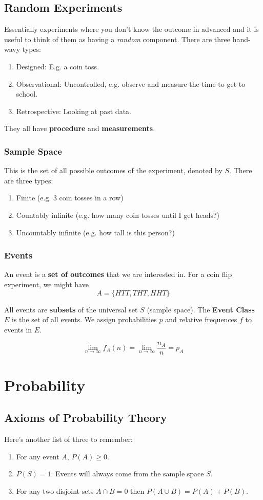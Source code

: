 \documentclass[a4paper,12pt]{report}
\begin{document}
\section{Random Experiments}
Essentially experiments where you don't know the outcome in advanced and it is useful to think of them as 
having a \textit{random} component. There are three hand-wavy types:
\begin{enumerate}
\item Designed: E.g. a coin toss.
\item Observational: Uncontrolled, e.g. observe and measure the time to get to school.
\item Retrospective: Looking at past data.
\end{enumerate}

They all have \textbf{procedure} and \textbf{measurements}. 

\subsection{Sample Space}
This is the set of all possible outcomes of the experiment, denoted by $S$. There are three types:
\begin{enumerate}
\item Finite (e.g. 3 coin tosses in a row)
\item Countably infinite (e.g. how many coin tosses until I get heads?)
\item Uncountably infinite (e.g. how tall is this person?)
\end{enumerate}

\subsection{Events}
An event is a \textbf{set of outcomes} that we are interested in. For a coin flip experiment, we might have
$$A = \{HTT, THT, HHT\}$$

All events are \textbf{subsets} of the universal set $S$ (sample space). The \textbf{Event Class $E$} is the 
set of all events. We assign probabilities $p$ and relative frequences $f$ to events in $E$.

$$\lim_{n \to \infty} f_A(n) = \lim_{n\to\infty} \frac{n_A}{n} = p_A$$

\chapter{Probability}
\section{Axioms of Probability Theory}
Here's another list of three to remember:
\begin{enumerate}
\item For any event $A$, $P(A) \geq 0$.
\item $P(S) = 1$. Events will always come from the sample space $S$.
\item For any two disjoint sets $A\cap B = 0$ then $P(A\cup B) = P(A) + P(B)$.
\end{enumerate}
\end{document}
